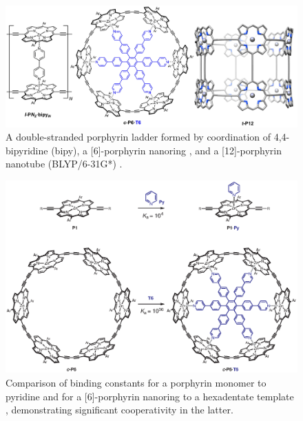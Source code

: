 	\begin{figure}[ht!]
		\centering\includegraphics[width=\textwidth]{figures/intro/porphy-supra.png} 
		\caption[]{A double-stranded porphyrin ladder formed by coordination of 4,4\tsup{\textprime{}}-bipyridine (bipy),\autocite{Taylor1999} a [6]-porphyrin nanoring ,\autocite{Hoffmann2008} and a [12]-porphyrin nanotube (BLYP/6-31G*) .\autocite{Neuhaus2015}}
		\label{fig:intro:porphy-supra}
	\end{figure}


	\begin{figure}[ht!]
		\centering\includegraphics[width=\textwidth]{figures/intro/porphy-binding.eps} 
		\caption[]{Comparison of binding constants for a porphyrin monomer to pyridine and for a [6]-porphyrin nanoring  to a hexadentate template , demonstrating significant cooperativity in the latter.}
		\label{fig:intro:porphy-binding}
	\end{figure}



